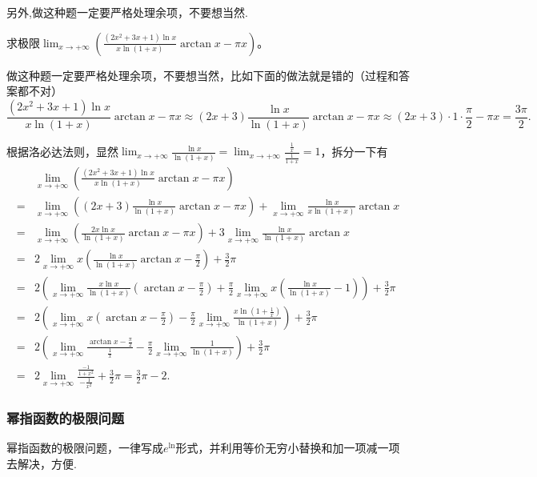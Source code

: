 \documentclass[lang=cn,newtx,10pt,scheme=chinese]{elegantbook}
\begin{document}
\begin{remark}
另外,做这种题一定要严格处理余项，不要想当然.
\end{remark}
\begin{example}
求极限\(\lim_{x\rightarrow +\infty}\left(\frac{(2x^2 + 3x + 1)\ln x}{x\ln(1 + x)}\arctan x-\pi x\right)\)。
\end{example}
\begin{remark}
做这种题一定要严格处理余项，不要想当然，比如下面的做法就是错的（过程和答案都不对）
\[\frac{(2x^2 + 3x + 1)\ln x}{x\ln(1 + x)}\arctan x-\pi x\approx(2x + 3)\frac{\ln x}{\ln(1 + x)}\arctan x-\pi x\approx(2x + 3)\cdot1\cdot\frac{\pi}{2}-\pi x=\frac{3\pi}{2}.\]
\end{remark}
\begin{solution}
根据洛必达法则，显然\(\lim_{x\rightarrow +\infty}\frac{\ln x}{\ln(1 + x)}=\lim_{x\rightarrow +\infty}\frac{\frac{1}{x}}{\frac{1}{1 + x}} = 1\)，拆分一下有
\begin{align*}
&\lim_{x\rightarrow +\infty}\left(\frac{(2x^2 + 3x + 1)\ln x}{x\ln(1 + x)}\arctan x-\pi x\right)\\
=&\lim_{x\rightarrow +\infty}\left((2x + 3)\frac{\ln x}{\ln(1 + x)}\arctan x-\pi x\right)+\lim_{x\rightarrow +\infty}\frac{\ln x}{x\ln(1 + x)}\arctan x\\
=&\lim_{x\rightarrow +\infty}\left(\frac{2x\ln x}{\ln(1 + x)}\arctan x-\pi x\right)+3\lim_{x\rightarrow +\infty}\frac{\ln x}{\ln(1 + x)}\arctan x\\
=&2\lim_{x\rightarrow +\infty}x\left(\frac{\ln x}{\ln(1 + x)}\arctan x-\frac{\pi}{2}\right)+\frac{3}{2}\pi\\
=&2\left(\lim_{x\rightarrow +\infty}\frac{x\ln x}{\ln(1 + x)}\left(\arctan x-\frac{\pi}{2}\right)+\frac{\pi}{2}\lim_{x\rightarrow +\infty}x\left(\frac{\ln x}{\ln(1 + x)}-1\right)\right)+\frac{3}{2}\pi\\
=&2\left(\lim_{x\rightarrow +\infty}x\left(\arctan x-\frac{\pi}{2}\right)-\frac{\pi}{2}\lim_{x\rightarrow +\infty}\frac{x\ln(1 + \frac{1}{x})}{\ln(1 + x)}\right)+\frac{3}{2}\pi\\
=&2\left(\lim_{x\rightarrow +\infty}\frac{\arctan x-\frac{\pi}{2}}{\frac{1}{x}}-\frac{\pi}{2}\lim_{x\rightarrow +\infty}\frac{1}{\ln(1 + x)}\right)+\frac{3}{2}\pi\\
=&2\lim_{x\rightarrow +\infty}\frac{\frac{-1}{1 + x^2}}{-\frac{1}{x^2}}+\frac{3}{2}\pi=\frac{3}{2}\pi - 2.
\end{align*}
\end{solution}

\subsubsection{幂指函数的极限问题}
幂指函数的极限问题，一律写成\(e^{\ln}\)形式，并利用等价无穷小替换和加一项减一项去解决，方便.
\end{document}
